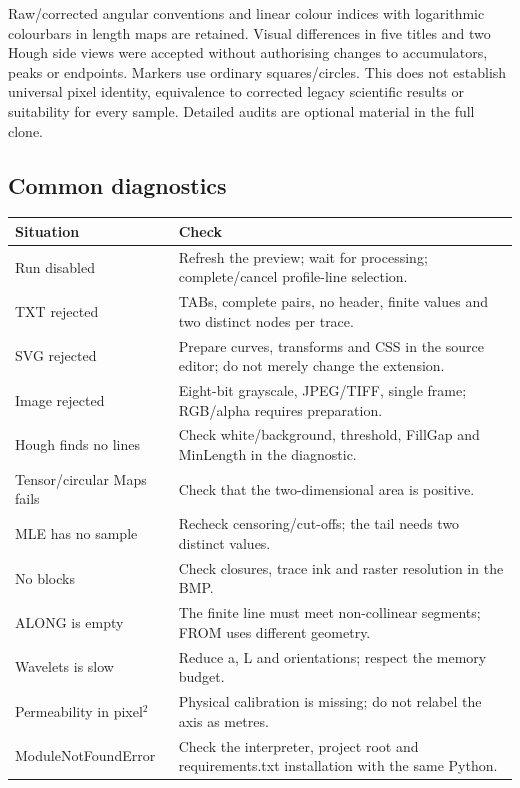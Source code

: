Raw/corrected angular conventions and linear colour indices with logarithmic colourbars in length maps are retained. Visual differences in five titles and two Hough side views were accepted without authorising changes to accumulators, peaks or endpoints. Markers use ordinary squares/circles. This does not establish universal pixel identity, equivalence to corrected legacy scientific results or suitability for every sample. Detailed audits are optional material in the full clone.

\subsection{Common diagnostics}
\begin{longtable}{@{}p{.34\linewidth}p{.58\linewidth}@{}}
\toprule Situation & Check\\\midrule\endhead
Run disabled & Refresh the preview; wait for processing; complete/cancel profile-line selection.\\
TXT rejected & TABs, complete pairs, no header, finite values and two distinct nodes per trace.\\
SVG rejected & Prepare curves, transforms and CSS in the source editor; do not merely change the extension.\\
Image rejected & Eight-bit grayscale, JPEG/TIFF, single frame; RGB/alpha requires preparation.\\
Hough finds no lines & Check white/background, threshold, FillGap and MinLength in the diagnostic.\\
Tensor/circular Maps fails & Check that the two-dimensional area is positive.\\
MLE has no sample & Recheck censoring/cut-offs; the tail needs two distinct values.\\
No blocks & Check closures, trace ink and raster resolution in the BMP.\\
ALONG is empty & The finite line must meet non-collinear segments; FROM uses different geometry.\\
Wavelets is slow & Reduce a, L and orientations; respect the memory budget.\\
Permeability in pixel\(^{2}\) & Physical calibration is missing; do not relabel the axis as metres.\\
ModuleNotFoundError & Check the interpreter, project root and requirements.txt installation with the same Python.\\\bottomrule
\end{longtable}

